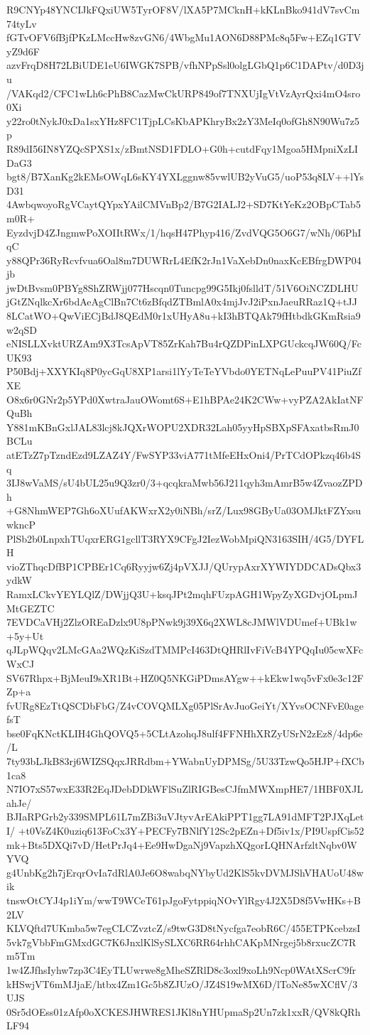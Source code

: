 R9CNYp48YNCIJkFQxiUW5TyrOF8V/lXA5P7MCknH+kKLnBko941dV7svCm74tyLv
fGTvOFV6fBjfPKzLMccHw8zvGN6/4WbgMu1AON6D88PMc8q5Fw+EZq1GTVyZ9d6F
azvFrqD8H72LBiUDE1eU6IWGK7SPB/vfhNPpSsl0olgLGbQ1p6C1DAPtv/d0D3ju
/VAKqd2/CFC1wLh6cPhB8CazMwCkURP849of7TNXUjIgVtVzAyrQxi4mO4sro0Xi
y22ro0tNykJ0xDa1sxYHz8FC1TjpLCsKbAPKhryBx2zY3MeIq0ofGh8N90Wu7z5p
R89dI56IN8YZQcSPXS1x/zBmtNSD1FDLO+G0h+cutdFqy1Mgoa5HMpniXzLIDaG3
bgt8/B7XanKg2kEMsOWqL6sKY4YXLggnw85vwlUB2yVuG5/uoP53q8LV++lYsD31
4AwbqwoyoRgVCaytQYpxYAilCMVnBp2/B7G2IALJ2+SD7KtYeKz2OBpCTab5m0R+
EyzdvjD4ZJngmwPoXOIItRWx/1/hqsH47Phyp416/ZvdVQG5O6G7/wNh/06PhIqC
y88QPr36RyRcvfvua6Oal8m7DUWRrL4EfK2rJn1VaXebDn0naxKcEBfrgDWP04jb
jwDtBvsm0PBYg8ShZRWjj077Hscqn0Tuncpg99G5Ikj0fslldT/51V6OiNCZDLHU
jGtZNqlkcXr6bdAeAgClBn7Ct6zBfqdZTBmlA0x4mjJvJ2iPxnJaeuRRaz1Q+tJJ
8LCatWO+QwViECjBdJ8QEdM0r1xUHyA8u+kI3hBTQAk79fHtbdkGKmRsia9w2qSD
eNISLLXvktURZAm9X3TcsApVT85ZrKah7Bu4rQZDPinLXPGUckcqJW60Q/FcUK93
P50Bdj+XXYKIq8P0ycGqU8XP1arsi1lYyTeTeYVbdo0YETNqLePuuPV41PiuZfXE
O8x6r0GNr2p5YPd0XwtraJauOWomt6S+E1hBPAe24K2CWw+vyPZA2AkIatNFQuBh
Y881mKBnGxlJAL83lcj8kJQXrWOPU2XDR32Lah05yyHpSBXpSFAxatbsRmJ0BCLu
atETzZ7pTzndEzd9LZAZ4Y/FwSYP33viA771tMfeEHxOni4/PrTCdOPkzq46b4Sq
3IJ8wVaMS/sU4bUL25u9Q3zr0/3+qcqkraMwb56J211qyh3mAmrB5w4ZvaozZPDh
+G8NhmWEP7Gh6oXUufAKWxrX2y0iNBh/srZ/Lux98GByUa03OMJktFZYxsuwkncP
PlSb2b0LnpxhTUqxrERG1gcllT3RYX9CFgJ2IezWobMpiQN3163SIH/4G5/DYFLH
vioZThqcDfBP1CPBEr1Cq6Ryyjw6Zj4pVXJJ/QUrypAxrXYWIYDDCADsQbx3ydkW
RamxLCkvYEYLQlZ/DWjjQ3U+ksqJPt2mqhFUzpAGH1WpyZyXGDvjOLpmJMtGEZTC
7EVDCaVHj2ZlzOREaDzlx9U8pPNwk9j39X6q2XWL8cJMWlVDUmef+UBk1w+5y+Ut
qJLpWQqv2LMcGAa2WQzKiSzdTMMPcI463DtQHRlIvFiVcB4YPQqIu05cwXFcWxCJ
SV67Rhpx+BjMeuI9sXR1Bt+HZ0Q5NKGiPDmsAYgw++kEkw1wq5vFx0e3c12FZp+a
fvURg8EzTtQSCDbFbG/Z4vCOVQMLXg05PlSrAvJuoGeiYt/XYvsOCNFvE0agefsT
bse0FqKNctKLIH4GhQOVQ5+5CLtAzohqJ8ulf4FFNHhXRZyUSrN2zEz8/4dp6e/L
7ty93bLJkB83rj6WIZSQqxJRRdbm+YWabnUyDPMSg/5U33TzwQo5HJP+fXCb1ca8
N7IO7xS57wxE33R2EqJDebDDkWFlSuZlRIGBesCJfmMWXmpHE7/1HBF0XJLahJe/
BJIaRPGrb2y339SMPL61L7mZBi3uVJtyvArEAkiPPT1gg7LA91dMFT2PJXqLetI/
+t0VsZ4K0uziq613FoCx3Y+PECFy7BNlfY12Sc2pEZn+Df5iv1x/PI9UspfCis52
mk+Bts5DXQi7vD/HetPrJq4+Ee9HwDgaNj9VapzhXQgorLQHNArfzltNqbv0WYVQ
g4UnbKg2h7jErqrOvIa7dRlA0Je6O8wabqNYbyUd2KlS5kvDVMJShVHAUoU48wik
tnswOtCYJ4p1iYm/wwT9WCeT61pJgoFytppiqNOvYlRgy4J2X5D8f5VwHKs+B2LV
KLVQftd7UKmba5w7egCLCZvztcZ/s9twG3D8tNycfga7eobR6C/455ETPKcebzsI
5vk7gVbbFmGMxdGC7K6JnxlKlSySLXC6RR64rhhCAKpMNrgej5b8rxucZC7Rm5Tm
1w4ZJfhsIyhw7zp3C4EyTLUwrwe8gMheSZRlD8c3oxl9xoLh9Ncp0WAtXScrC9fr
kHSwjVT6mMJjaE/htbx4Zm1Gc5b8ZJUzO/JZ4S19wMX6D/lToNe85wXCflV/3UJS
0Sr5dOEss01zAfp0oXCKESJHWRES1JKl8nYHUpmaSp2Un7zk1xxR/QV8kQRhLF94
